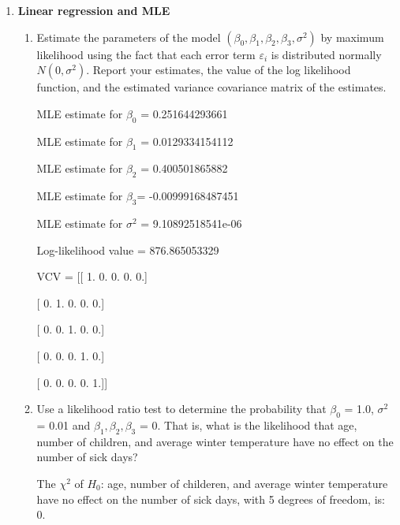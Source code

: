 \documentclass[letterpaper,12pt]{article}
\theoremstyle{definition}
\begin{document}
\begin{enumerate}
\item \textbf{ Linear regression and MLE}
\begin {enumerate}
\item Estimate the parameters of the model $(\beta_{0}, \beta_{1}, \beta_{2}, \beta_{3}, \sigma^2)$ by maximum likelihood using the fact that each error term $\varepsilon_i$ is distributed normally $N(0, \sigma^2)$. Report your estimates, the value of the log likelihood function, and the estimated variance covariance matrix of the estimates.
\par\bigskip
MLE estimate for $\beta_{0}$ = 0.251644293661  \par
MLE estimate for $\beta_{1}$ = 0.0129334154112 \par
MLE estimate for $\beta_{2}$ = 0.400501865882 \par
MLE estimate for $\beta_{3}$= -0.00999168487451 \par
MLE estimate for $\sigma^2$ = 9.10892518541e-06 \par
Log-likelihood value = 876.865053329\par
VCV = [[ 1.  0.  0.  0.  0.] \par
\hspace{12mm}   [ 0.  1.  0.  0.  0.] \par
\hspace{12mm}   [ 0.  0.  1.  0.  0.] \par
\hspace{12mm}   [ 0.  0.  0.  1.  0.] \par
\hspace{12mm}   [ 0.  0.  0.  0.  1.]]
\par\bigskip

\item Use a likelihood ratio test to determine the probability that $\beta_0$ = 1.0, $\sigma^2$ = 0.01 and $\beta_1, \beta_2, \beta_3$ = 0. That is, what is the likelihood that age, number of children, and average winter temperature have no effect on the number of sick days?
\par\bigskip
The $\chi^2$ of $H_0$: age, number of childeren, and average winter temperature have no effect on the number of sick days, with 5 degrees of freedom, is: 0.

\end {enumerate}
\end {enumerate}
\end{document}
